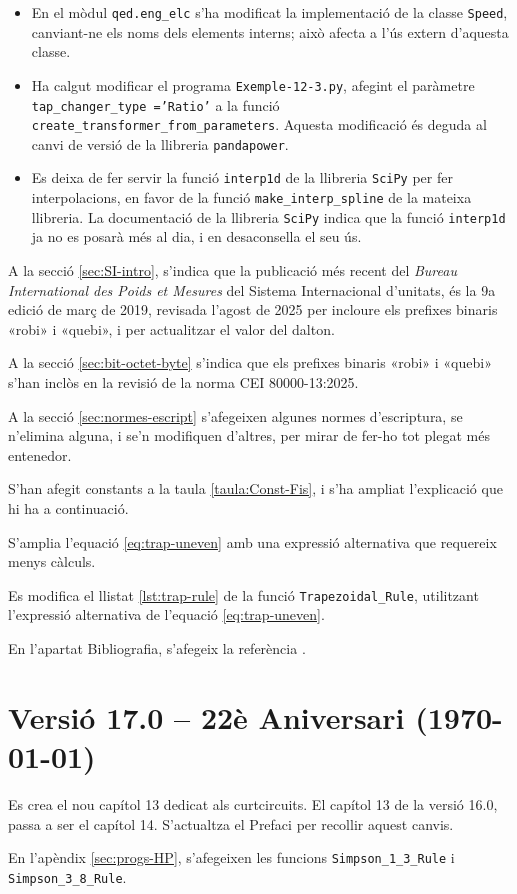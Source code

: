 \begin{itemize}
    \item En el mòdul \texttt{qed.eng\_elc} s'ha modificat la implementació  de la classe \texttt{Speed}, canviant-ne els noms dels elements interns; això afecta a l'ús extern d'aquesta classe.

    \item Ha calgut modificar el programa \texttt{Exemple-12-3.py}, afegint el paràmetre \texttt{tap\_changer\_type ='Ratio'} a la funció \texttt{create\_transformer\_from\_parameters}.
     Aquesta modificació és deguda al canvi de versió de la llibreria \texttt{pandapower}.

    \item Es deixa de fer servir la funció \texttt{interp1d} de la llibreria \texttt{SciPy} per fer interpolacions, en favor de  la funció \texttt{make\_interp\_spline} de la mateixa llibreria.
    La documentació de la llibreria \texttt{SciPy} indica que la  funció \texttt{interp1d} ja no es posarà més al dia, i en desaconsella el seu ús.
\end{itemize}

A la secció \ref{sec:SI-intro}, s'indica que la publicació més recent del \textit{Bureau 	International des Poids et Mesures} del Sistema Internacional d'unitats, és la  9a edició de març de 2019, revisada l'agost de 2025 per incloure els prefixes binaris «robi» i «quebi», i per actualitzar el valor del dalton.

A la secció \ref{sec:bit-octet-byte} s'indica que els prefixes binaris «robi» i «quebi»  s'han inclòs en la revisió de la norma CEI 80000-13:2025.

A la secció \ref{sec:normes-escript} s'afegeixen algunes normes d'escriptura, se n'elimina alguna, i se'n modifiquen d'altres, per mirar de  fer-ho tot plegat més entenedor.

S'han afegit constants a la taula \ref{taula:Const-Fis}, i s'ha ampliat l'explicació que hi ha a continuació.

S'amplia l'equació \eqref{eq:trap-uneven} amb una expressió alternativa que requereix menys càlculs.

Es modifica el llistat \ref{lst:trap-rule} de la funció \texttt{Trapezoidal\_Rule}, utilitzant l'expressió alternativa de l'equació \eqref{eq:trap-uneven}.

En l'apartat Bibliografia, s'afegeix la referència \cite{SSMH}.


\section*{Versió 17.0 -- 22è Aniversari (\today)}

Es crea el nou capítol 13 dedicat als curtcircuits.
El capítol 13 de la versió 16.0, passa a ser el capítol 14.
S'actualtza el Prefaci per recollir aquest canvis.

En l'apèndix \ref{sec:progs-HP}, s'afegeixen les funcions \texttt{Simpson\_1\_3\_Rule} i \texttt{Simpson\_3\_8\_Rule}.
